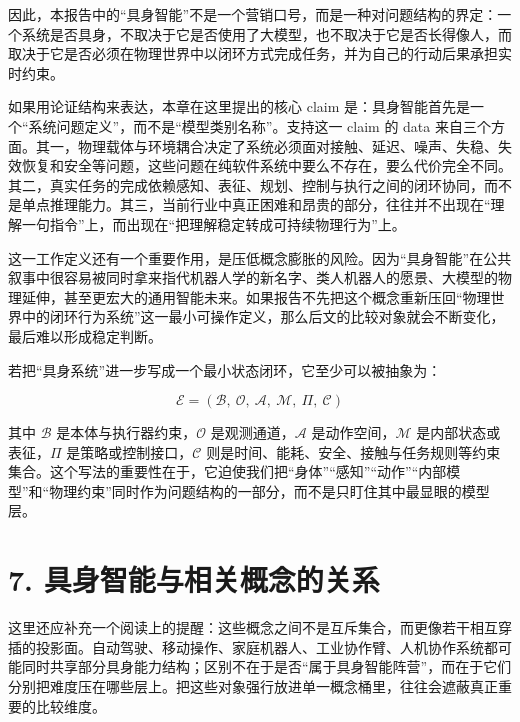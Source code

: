 因此，本报告中的“具身智能”不是一个营销口号，而是一种对问题结构的界定：一个系统是否具身，不取决于它是否使用了大模型，也不取决于它是否长得像人，而取决于它是否必须在物理世界中以闭环方式完成任务，并为自己的行动后果承担实时约束。

如果用论证结构来表达，本章在这里提出的核心 claim 是：具身智能首先是一个“系统问题定义”，而不是“模型类别名称”。支持这一 claim 的 data 来自三个方面。其一，物理载体与环境耦合决定了系统必须面对接触、延迟、噪声、失稳、失效恢复和安全等问题，这些问题在纯软件系统中要么不存在，要么代价完全不同。其二，真实任务的完成依赖感知、表征、规划、控制与执行之间的闭环协同，而不是单点推理能力。其三，当前行业中真正困难和昂贵的部分，往往并不出现在“理解一句指令”上，而出现在“把理解稳定转成可持续物理行为”上。

这一工作定义还有一个重要作用，是压低概念膨胀的风险。因为“具身智能”在公共叙事中很容易被同时拿来指代机器人学的新名字、类人机器人的愿景、大模型的物理延伸，甚至更宏大的通用智能未来。如果报告不先把这个概念重新压回“物理世界中的闭环行为系统”这一最小可操作定义，那么后文的比较对象就会不断变化，最后难以形成稳定判断。

若把“具身系统”进一步写成一个最小状态闭环，它至少可以被抽象为：

\begingroup
\footnotesize
\begin{equation*}
\mathcal{E} = (\mathcal{B},\ \mathcal{O},\ \mathcal{A},\ \mathcal{M},\ \Pi,\ \mathcal{C})
\end{equation*}
\endgroup

其中 \(\mathcal{B}\) 是本体与执行器约束，\(\mathcal{O}\) 是观测通道，\(\mathcal{A}\) 是动作空间，\(\mathcal{M}\) 是内部状态或表征，\(\Pi\) 是策略或控制接口，\(\mathcal{C}\) 则是时间、能耗、安全、接触与任务规则等约束集合。这个写法的重要性在于，它迫使我们把“身体”“感知”“动作”“内部模型”和“物理约束”同时作为问题结构的一部分，而不是只盯住其中最显眼的模型层。

\section*{7. 具身智能与相关概念的关系}

这里还应补充一个阅读上的提醒：这些概念之间不是互斥集合，而更像若干相互穿插的投影面。自动驾驶、移动操作、家庭机器人、工业协作臂、人机协作系统都可能同时共享部分具身能力结构；区别不在于是否“属于具身智能阵营”，而在于它们分别把难度压在哪些层上。把这些对象强行放进单一概念桶里，往往会遮蔽真正重要的比较维度。


